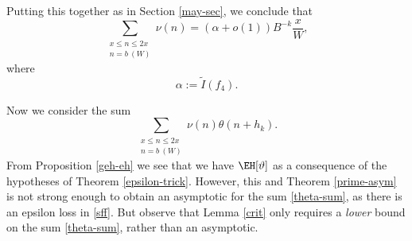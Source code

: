 Putting this together as in Section \ref{may-sec}, we conclude that
$$ \sum_{\substack{x \leq n \leq 2x\\ n = b\ (W)}} \nu(n) = (\alpha + o(1)) B^{-k} \frac{x}{W}, $$
where 
$$ \alpha := \tilde I(f_4).$$

Now we consider the sum
\begin{equation}\label{theta-sum}
 \sum_{\substack{x \leq n \leq 2x\\ n = b\ (W)}} \nu(n) \theta(n+h_k).
\end{equation}
From Proposition \ref{geh-eh} we see that we have $\EH[\vartheta]$ as a consequence of the hypotheses of Theorem \ref{epsilon-trick}.  However, this and Theorem \ref{prime-asym} is not strong enough to obtain an asymptotic for the sum \eqref{theta-sum}, as there is an epsilon loss in \eqref{sff}.  But observe that Lemma \ref{crit} only requires a \emph{lower} bound on the sum \eqref{theta-sum}, rather than an asymptotic. 

